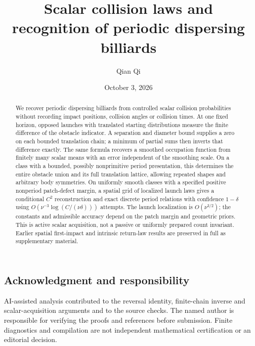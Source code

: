 \documentclass[11pt]{amsart}
\title[Scalar collision laws]{Scalar collision laws and recognition of periodic dispersing billiards}
\author{Qian Qi}\date{October 3, 2026}
\theoremstyle{definition}\newtheorem{definition}[theorem]{Definition}
\theoremstyle{remark}\newtheorem{remark}[theorem]{Remark}
\numberwithin{equation}{section}
\begin{document}
\raggedbottom
\begin{abstract}
We recover periodic dispersing billiards from controlled scalar collision
probabilities without recording impact positions, collision angles or
collision times. At one fixed horizon, opposed launches with translated
starting distributions measure the finite difference of the obstacle
indicator. A separation and diameter bound supplies a zero on each
bounded translation chain; a minimum of partial sums then inverts that
difference exactly. The same formula recovers a smoothed occupation
function from finitely many scalar means with an error independent of
the smoothing scale. On a class with a bounded, possibly nonprimitive
period presentation, this determines the entire obstacle union and its
full translation lattice, allowing repeated shapes and arbitrary body
symmetries. On uniformly smooth classes with a specified positive
nonperiod patch-defect margin, a spatial grid of localized launch laws
gives a conditional $C^2$ reconstruction and exact discrete period
relations with confidence $1-\delta$ using
$O(\nu^{-3}\log(C/(\nu\delta)))$ attempts. The launch localization is
$O(\nu^{3/2})$; the constants and admissible accuracy depend on the
patch margin and geometric priors. This is active scalar acquisition,
not a passive or uniformly prepared count invariant. Earlier spatial
first-impact and intrinsic return-law results are preserved in full
as supplementary material.
\end{abstract}\maketitle





\subsection*{Acknowledgment and responsibility}
AI-assisted analysis contributed to the reversal identity, finite-chain
inverse and scalar-acquisition arguments and to the source checks. The
named author is responsible for verifying the proofs and references
before submission. Finite diagnostics and compilation are not independent
mathematical certification or an editorial decision.

\end{document}
